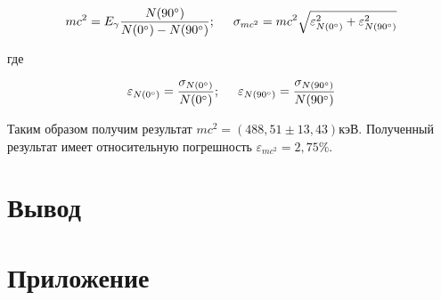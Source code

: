 \documentclass[12pt]{article}
\begin{document}
    $$
      mc^2 = E_{\gamma} \frac{N(90^{\circ})}{N(0^{\circ}) - N(90^{\circ})};
      \hspace{0.5cm}
      \sigma_{mc^2} = mc^2 \sqrt{\varepsilon_{N(0^{\circ})}^2 +
      \varepsilon_{N(90^{\circ})}^2}
    $$

    где

    $$
      \varepsilon_{N(0^{\circ})} = \frac{\sigma_{N(0^{\circ})}}{N(0^{\circ})};
      \hspace{0.5cm}
      \varepsilon_{N(90^{\circ})} = \frac{\sigma_{N(90^{\circ})}}{N(90^{\circ})}
    $$

    Таким образом получим результат $mc^2 = (488,51 \pm 13,43) кэВ$. Полученный
    результат имеет относительную погрешность $\varepsilon_{mc^2} = 2,75\%$.

  \section{Вывод}

  \newpage
  \section{Приложение}
  \label{add:spectres}
\end{document}
